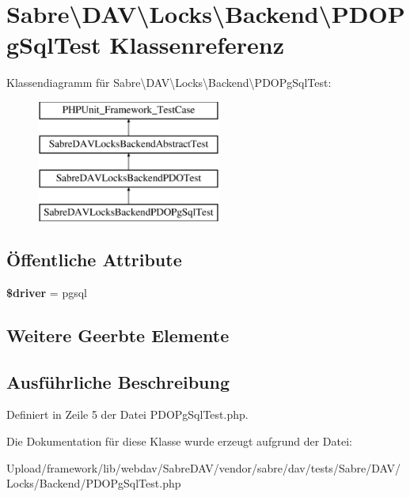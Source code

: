 \hypertarget{class_sabre_1_1_d_a_v_1_1_locks_1_1_backend_1_1_p_d_o_pg_sql_test}{}\section{Sabre\textbackslash{}D\+AV\textbackslash{}Locks\textbackslash{}Backend\textbackslash{}P\+D\+O\+Pg\+Sql\+Test Klassenreferenz}
\label{class_sabre_1_1_d_a_v_1_1_locks_1_1_backend_1_1_p_d_o_pg_sql_test}
Klassendiagramm für Sabre\textbackslash{}D\+AV\textbackslash{}Locks\textbackslash{}Backend\textbackslash{}P\+D\+O\+Pg\+Sql\+Test\+:\begin{figure}[H]
\begin{center}
\leavevmode
\includegraphics[height=4.000000cm]{class_sabre_1_1_d_a_v_1_1_locks_1_1_backend_1_1_p_d_o_pg_sql_test}
\end{center}
\end{figure}
\subsection*{Öffentliche Attribute}
\begin{DoxyCompactItemize}
\item 
\mbox{\label{class_sabre_1_1_d_a_v_1_1_locks_1_1_backend_1_1_p_d_o_pg_sql_test_a0df024cc4228a37fd7c6816908ab4f64}} 
{\bfseries \$driver} = \textquotesingle{}pgsql\textquotesingle{}
\end{DoxyCompactItemize}
\subsection*{Weitere Geerbte Elemente}


\subsection{Ausführliche Beschreibung}


Definiert in Zeile 5 der Datei P\+D\+O\+Pg\+Sql\+Test.\+php.



Die Dokumentation für diese Klasse wurde erzeugt aufgrund der Datei\+:\begin{DoxyCompactItemize}
\item 
Upload/framework/lib/webdav/\+Sabre\+D\+A\+V/vendor/sabre/dav/tests/\+Sabre/\+D\+A\+V/\+Locks/\+Backend/P\+D\+O\+Pg\+Sql\+Test.\+php\end{DoxyCompactItemize}
